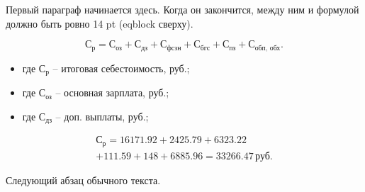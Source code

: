 \documentclass[14pt]{extarticle}
\newenvironment{eqblock}{%
  \par\vspace*{14pt}\noindent  %
}{%
  \vspace*{14pt}\par          %
}
\newenvironment{symblock}{%
  \par\noindent  %
}{%
  \vspace*{14pt}\par  %
}
\newenvironment{calcblock}{%
  \par\noindent  %
}{%
  \vspace*{14pt}\par  %
}
\begin{document}

Первый параграф начинается здесь. Когда он закончится, 
между ним и формулой должно быть ровно 14 pt (eqblock сверху).

\begin{eqblock}
  \begin{equation}\label{eq:sum_expenses}
    \text{С}_\text{р} 
      = \text{С}_\text{оз} 
      + \text{С}_\text{дз} 
      + \text{С}_\text{фсзн} 
      + \text{С}_\text{бгс} 
      + \text{С}_\text{пз} 
      + \text{С}_\text{обп, обх}.
  \end{equation}
\end{eqblock}

\begin{symblock}
  \begin{itemize}[nosep,
                   leftmargin=0pt,
                   labelindent=0pt,
                   topsep=0pt,
                   partopsep=0pt,
                   itemsep=0pt,
                   parsep=0pt]
    \item[] где $\text{С}_\text{р}$  – итоговая себестоимость, руб.;
    \item[] где $\text{С}_\text{оз}$ – основная зарплата, руб.;
    \item[] где $\text{С}_\text{дз}$ – доп. выплаты, руб.;
  \end{itemize}
\end{symblock}

\begin{calcblock}
  \begin{multline*}
    \text{С}_\text{р} = 16171.92 
      + 2425.79 
      + 6323.22 \\
      + 111.59 
      + 148 
      + 6885.96 
      = 33266.47\,\text{руб.}
  \end{multline*}
\end{calcblock}

Следующий абзац обычного текста.  %

\end{document}

